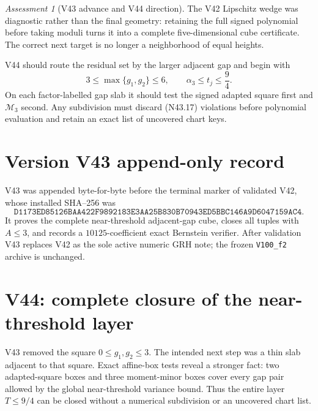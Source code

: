 \documentclass[11pt]{article}
\theoremstyle{definition}
\theoremstyle{remark}
\newtheorem{assessment}[theorem]{Assessment}
\begin{document}
\begin{assessment}[V43 advance and V44 direction]
\label{ass:f2v43}
The V42 Lipschitz wedge was diagnostic rather than the final geometry:
retaining the full signed polynomial before taking moduli turns it into a
complete five-dimensional cube certificate.  The correct next target is
no longer a neighborhood of equal heights.

V44 should route the residual set by the larger adjacent gap and begin
with
\[
 3\leq\max\{g_1,g_2\}\leq6,\qquad
 \alpha_3\leq t_j\leq\frac94.
\tag{N43.18}
\]
On each factor-labelled gap slab it should test the signed adapted square
first and \(\mathcal M_3\) second.  Any subdivision must discard
\textup{(N43.17)} violations before polynomial evaluation and retain an
exact list of uncovered chart keys.
\end{assessment}

\section*{Version V43 append-only record}

V43 was appended byte-for-byte before the terminal marker of validated
V42, whose installed SHA--256 was
\[
 \texttt{D1173ED85126BAA422F9892183E3AA25}
 \allowbreak\texttt{B830B70943ED5BBC146A9D6047159AC4}.
\tag{N43.19}
\]
It proves the complete near-threshold adjacent-gap cube, closes all
tuples with \(A\leq3\), and records a \(10125\)-coefficient exact
Bernstein verifier.  After validation V43 replaces V42 as the sole active
numeric GRH note; the frozen \texttt{V100\_f2} archive is unchanged.





\section{V44: complete closure of the near-threshold layer}
\label{sec:f2v44-complete-near}

V43 removed the square \(0\leq g_1,g_2\leq3\).  The intended next step
was a thin slab adjacent to that square.  Exact affine-box tests reveal
a stronger fact: two adapted-square boxes and three moment-minor boxes
cover every gap pair allowed by the global near-threshold variance
bound.  Thus the entire layer \(T\leq9/4\) can be closed without a
numerical subdivision or an uncovered chart list.
\end{document}
